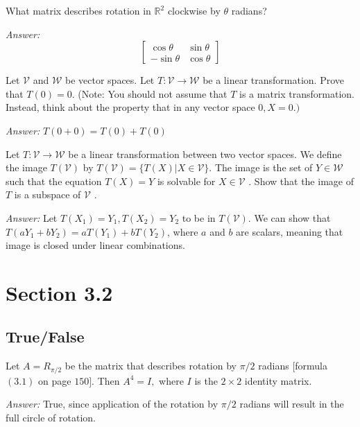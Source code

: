 \documentclass[letterpaper]{article}
\newcommand{\ans}{\textit{Answer: }}
\newenvironment{question}[2][Question]{\begin{trivlist}
\item[\hskip \labelsep {\bfseries #1}\hskip \labelsep {\bfseries #2.}]}{\end{trivlist}}
\begin{document}
\begin{question}{3.17}
    What matrix describes rotation in $\mathbb { R } ^ { 2 }$ clockwise by $\theta$ radians?
    
    \ans 
    $$
    \begin{bmatrix}
        \cos \theta & \sin \theta \\
        -\sin \theta & \cos \theta
    \end{bmatrix}
    $$
\end{question}

\begin{question}{3.21}
    Let $\mathcal { V }$ and $\mathcal { W }$ be vector spaces. Let 
    $T : \mathcal { V } \rightarrow \mathcal { W }$ be a linear transformation.
    Prove that $T ( 0 ) = 0 .$ (Note: You should not assume that $T$ is a matrix 
    transformation. Instead, think about the property that in any vector space $0 , X = 0 . )$

    \ans $T(0 + 0) = T(0) + T(0)$
\end{question}

\begin{question}{3.24}
    Let $T : \mathcal { V } \rightarrow \mathcal { W }$ be a linear transformation between two vector spaces. We
define the image $T ( \mathcal { V } )$ by $T ( \mathcal { V } ) = \{ T ( X ) | X \in \mathcal { V } \} .$ The image is the set
of $Y \in \mathcal { W }$ such that the equation $T ( X ) = Y$ is solvable for $X \in \mathcal { V }$ . Show that
the image of $T$ is a subspace of $\mathcal { V }$ .

    \ans Let $T(X_1) = Y_1, T(X_2) = Y_2$ to be in $T ( \mathcal { V } )$. We can
    show that $T(aY_1 + bY_2) = aT(Y_1) + bT(Y_2)$, where $a$ and $b$ are scalars, meaning
    that image is closed under linear combinations.
\end{question}

\section{Section 3.2}
\subsection{True/False}

\begin{question}{3.14}
    Let $A = R _ { \pi / 2 }$ be the matrix that describes rotation by $\pi / 2$ radians [formula $( 3.1 )$
    on page $150 ] .$ Then $A ^ { 4 } = I ,$ where $I$ is the $2 \times 2$ identity matrix.

    \ans True, since application of the rotation by $\pi / 2$ radians will result
    in the full circle of rotation.
\end{question}
\end{document}
